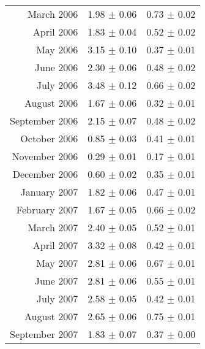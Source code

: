 \documentclass[a4paper,12pt]{article}
\begin{document}
\begin{center}
\begin{longtable}{|r|c|c|}
    March       2006    &       1.98    $\pm$   0.06    &       0.73    $\pm$   0.02    \\
    April       2006    &       1.83    $\pm$   0.04    &       0.52    $\pm$   0.02    \\
    May         2006    &       3.15    $\pm$   0.10    &       0.37    $\pm$   0.01    \\
    June        2006    &       2.30    $\pm$   0.06    &       0.48    $\pm$   0.02    \\
    July        2006    &       3.48    $\pm$   0.12    &       0.66    $\pm$   0.02    \\
    August      2006    &       1.67    $\pm$   0.06    &       0.32    $\pm$   0.01    \\
    September   2006    &       2.15    $\pm$   0.07    &       0.48    $\pm$   0.02    \\
    October     2006    &       0.85    $\pm$   0.03    &       0.41    $\pm$   0.01    \\
    November    2006    &       0.29    $\pm$   0.01    &       0.17    $\pm$   0.01    \\
    December    2006    &       0.60    $\pm$   0.02    &       0.35    $\pm$   0.01    \\
    January     2007    &       1.82    $\pm$   0.06    &       0.47    $\pm$   0.01    \\
    February    2007    &       1.67    $\pm$   0.05    &       0.66    $\pm$   0.02    \\
    March       2007    &       2.40    $\pm$   0.05    &       0.52    $\pm$   0.01    \\
    April       2007    &       3.32    $\pm$   0.08    &       0.42    $\pm$   0.01    \\
    May         2007    &       2.81    $\pm$   0.06    &       0.67    $\pm$   0.01    \\
    June        2007    &       2.81    $\pm$   0.06    &       0.55    $\pm$   0.01    \\
    July        2007    &       2.58    $\pm$   0.05    &       0.42    $\pm$   0.01    \\
    August      2007    &       2.65    $\pm$   0.06    &       0.75    $\pm$   0.01    \\
    September   2007    &       1.83    $\pm$   0.07    &       0.37    $\pm$   0.00    \\

  \end{longtable}
\end{center}
\end{document}
